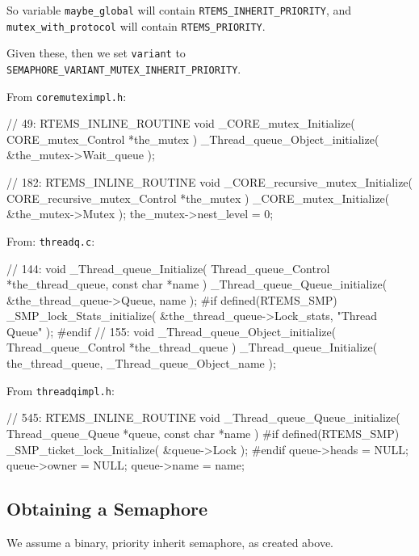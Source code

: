 So
 variable \verb"maybe_global" will contain \verb"RTEMS_INHERIT_PRIORITY",
 and \verb"mutex_with_protocol" will contain \verb"RTEMS_PRIORITY".

 Given these, then we set \verb"variant"
 to \verb"SEMAPHORE_VARIANT_MUTEX_INHERIT_PRIORITY".


From \texttt{coremuteximpl.h}:
\begin{nicec}
// 49:
RTEMS_INLINE_ROUTINE void _CORE_mutex_Initialize(
  CORE_mutex_Control *the_mutex
)
{
  _Thread_queue_Object_initialize( &the_mutex->Wait_queue );
}

// 182:
RTEMS_INLINE_ROUTINE void _CORE_recursive_mutex_Initialize(
  CORE_recursive_mutex_Control *the_mutex
)
{
  _CORE_mutex_Initialize( &the_mutex->Mutex );
  the_mutex->nest_level = 0;
}
\end{nicec}

From: \texttt{threadq.c}:
\begin{nicec}
// 144:
void _Thread_queue_Initialize(
  Thread_queue_Control *the_thread_queue,
  const char           *name
)
{
  _Thread_queue_Queue_initialize( &the_thread_queue->Queue, name );
#if defined(RTEMS_SMP)
  _SMP_lock_Stats_initialize( &the_thread_queue->Lock_stats, "Thread Queue" );
#endif
}
// 155:
void _Thread_queue_Object_initialize( Thread_queue_Control *the_thread_queue )
{
  _Thread_queue_Initialize( the_thread_queue, _Thread_queue_Object_name );
}
\end{nicec}

From \texttt{threadqimpl.h}:
\begin{nicec}
// 545:
RTEMS_INLINE_ROUTINE void _Thread_queue_Queue_initialize(
  Thread_queue_Queue *queue,
  const char         *name
)
{
#if defined(RTEMS_SMP)
  _SMP_ticket_lock_Initialize( &queue->Lock );
#endif
  queue->heads = NULL;
  queue->owner = NULL;
  queue->name = name;
}
\end{nicec}

\subsection{Obtaining a Semaphore}

We assume a binary, priority inherit semaphore,
as created above.

